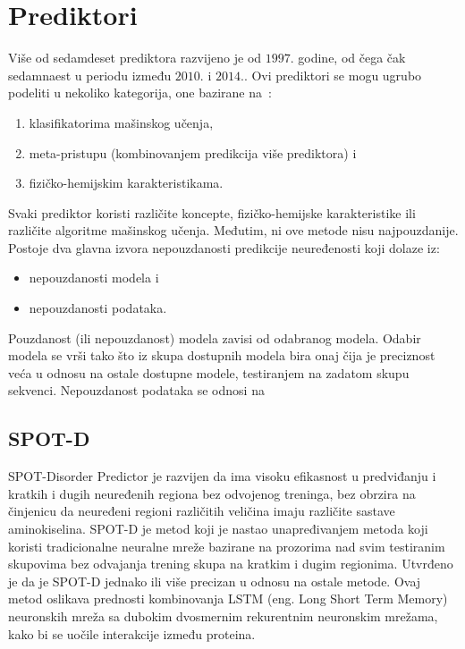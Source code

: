 \section{Prediktori}

Više od sedamdeset prediktora razvijeno je od $1997.$ godine, od čega čak sedamnaest u periodu između $2010.$ i $2014.$. Ovi prediktori se mogu ugrubo podeliti u nekoliko kategorija, one bazirane na~\cite{PredictorsOverview}:
\begin{enumerate}
\item klasifikatorima mašinskog učenja,
\item meta-pristupu (kombinovanjem predikcija više prediktora) i 
\item fizičko-hemijskim karakteristikama.
\end{enumerate}

Svaki prediktor koristi različite koncepte, fizičko-hemijske karakteristike ili različite algoritme mašinskog učenja. Međutim, ni ove metode nisu najpouzdanije. Postoje dva glavna izvora nepouzdanosti predikcije neuređenosti koji dolaze iz:
\begin{itemize}
\item nepouzdanosti modela i
\item nepouzdanosti podataka.
\end{itemize}

Pouzdanost (ili nepouzdanost) modela zavisi od odabranog modela. Odabir modela se vrši tako što iz skupa dostupnih modela bira onaj čija je preciznost veća u odnosu na ostale dostupne modele, testiranjem na zadatom skupu sekvenci.
Nepouzdanost podataka se odnosi na  ~\cite{MolBioSyst}


\subsection{SPOT-D}

SPOT-Disorder Predictor je razvijen da ima visoku efikasnost u predviđanju i kratkih i dugih neuređenih regiona bez odvojenog treninga, bez obrzira na činjenicu da neuređeni regioni različitih veličina imaju različite sastave aminokiselina. SPOT-D je metod koji je nastao unapređivanjem metoda koji koristi tradicionalne neuralne mreže bazirane na prozorima nad svim testiranim skupovima bez odvajanja trening skupa na kratkim i dugim regionima. Utvrđeno je da je SPOT-D jednako ili više precizan u odnosu na ostale metode. Ovaj metod oslikava prednosti kombinovanja LSTM (eng. Long Short Term Memory) neuronskih mreža sa dubokim dvosmernim rekurentnim neuronskim mrežama, kako bi se uočile interakcije između proteina.
~\cite{SPOTD}


